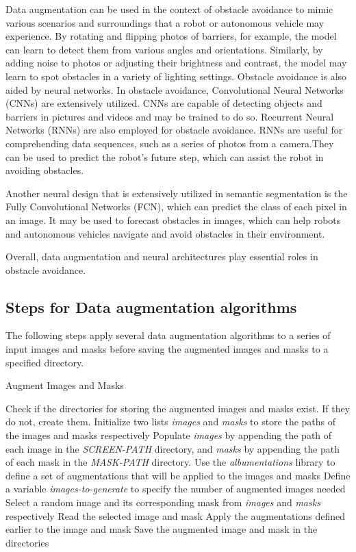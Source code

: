 \documentclass[11pt, a4paper, openany]{book}
\begin{document}
Data augmentation can be used in the context of obstacle avoidance to mimic various scenarios and surroundings that a robot or autonomous vehicle may experience.
By rotating and flipping photos of barriers, for example, the model can learn to detect them from various angles and orientations. Similarly, by adding noise to photos or adjusting their brightness and contrast, the model may learn to spot obstacles in a variety of lighting settings.
Obstacle avoidance is also aided by neural networks. In obstacle avoidance, Convolutional Neural Networks (CNNs) are extensively utilized. CNNs are capable of detecting objects and barriers in pictures and videos and may be trained to do so. Recurrent Neural Networks (RNNs) are also employed for obstacle avoidance. RNNs are useful for comprehending data sequences, such as a series of photos from a camera.They can be used to predict the robot's future step, which can assist the robot in avoiding obstacles.

Another neural design that is extensively utilized in semantic segmentation is the Fully Convolutional Networks (FCN), which can predict the class of each pixel in an image. It may be used to forecast obstacles in images, which can help robots and autonomous vehicles navigate and avoid obstacles in their environment.

Overall, data augmentation and neural architectures play essential roles in obstacle avoidance.
\subsection{Steps for Data augmentation algorithms}
The following steps apply several data augmentation algorithms to a series of input images and masks before saving the augmented images and masks to a specified directory.

\begin{algorithm}
\caption{Augment Images and Masks}
\label{alg:augment}
\begin{algorithmic}[1]
\State Check if the directories for storing the augmented images and masks exist. If they do not, create them.
\State Initialize two lists \textit{images} and \textit{masks} to store the paths of the images and masks respectively
\State Populate \textit{images} by appending the path of each image in the \textit{SCREEN-PATH} directory, and \textit{masks} by appending the path of each mask in the \textit{MASK-PATH} directory.
\State Use the \textit{albumentations} library to define a set of augmentations that will be applied to the images and masks
\State Define a variable \textit{images-to-generate} to specify the number of augmented images needed
\State Select a random image and its corresponding mask from \textit{images} and \textit{masks} respectively
\State Read the selected image and mask
\State Apply the augmentations defined earlier to the image and mask
\State Save the augmented image and mask in the directories
\EndFor
\end{algorithmic}
\end{algorithm}
\end{document}
